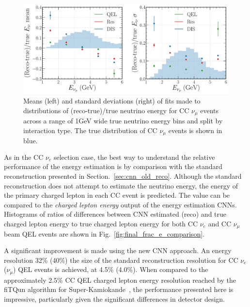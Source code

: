 \begin{figure} %
    \includegraphics[width=\textwidth]{diagrams/7-results/final_energy_numu.pdf}
    \caption[Means and standard deviations of fits to $\nu_{\mu}$ energy distributions]
    {Means (left) and standard deviations (right) of fits made to distributions of
        (reco-true)/true neutrino energy for CC $\nu_{\mu}$ events across a range of \unit{1}{GeV}
        wide true neutrino energy bins and split by interaction type. The true distribution of CC
        $\nu_{\mu}$ events is shown in blue.}
    \label{fig:final_energy_numu}
\end{figure}

As in the CC $\nu_{e}$ selection case, the best way to understand the relative performance of the
energy estimation is by comparison with the standard \chips reconstruction presented in
Section.~\ref{sec:cnn_old_reco}. Although the standard reconstruction does not attempt to estimate
the neutrino energy, the energy of the primary charged lepton in each CC event is predicted. The
value can be compared to the \emph{charged lepton energy} output of the energy estimation CNNs.
Histograms of ratios of differences between CNN estimated (reco) and true charged lepton energy to
true charged lepton energy for both CC $\nu_{e}$ and CC $\nu_{\mu}$ beam QEL events are shown in
Fig.~\ref{fig:final_frac_e_comparison}.

A significant improvement is made using the new CNN approach. An energy resolution 32\% (40\%) the
size of the standard reconstruction resolution for CC $\nu_{e}$ ($\nu_{\mu}$) QEL events is
achieved, at 4.5\% (4.0\%). When compared to the approximately 2.5\% CC QEL charged lepton energy
resolution reached by the fiTQun algorithm for Super-Kamiokande~\cite{jiang2019}, the performance
presented here is impressive, particularly given the significant differences in detector design.

